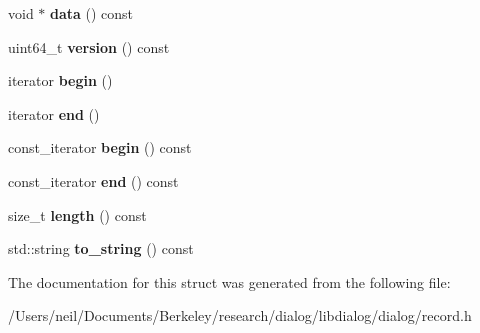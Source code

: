 \begin{DoxyCompactItemize}
void $\ast$ {\bfseries data} () const
\item 
\mbox{\label{structdialog_1_1record__t_a52dbda4f5f04a5ec4c5588241c3a5533}} 
uint64\+\_\+t {\bfseries version} () const
\item 
\mbox{\label{structdialog_1_1record__t_a841131722da9228e784e29188ba77c5b}} 
iterator {\bfseries begin} ()
\item 
\mbox{\label{structdialog_1_1record__t_ae0881e9d5b98f01480cb62da5441795c}} 
iterator {\bfseries end} ()
\item 
\mbox{\label{structdialog_1_1record__t_a56205f6df46bbd0003d33c7a1fc97814}} 
const\+\_\+iterator {\bfseries begin} () const
\item 
\mbox{\label{structdialog_1_1record__t_a3c11548c92f6fe3c8c02adaeeca3a6f1}} 
const\+\_\+iterator {\bfseries end} () const
\item 
\mbox{\label{structdialog_1_1record__t_a6b7f1ea9625f0dad11bc53dcedb2f1a6}} 
size\+\_\+t {\bfseries length} () const
\item 
\mbox{\label{structdialog_1_1record__t_a60677227ea92a2e7672bd4bb16d615f3}} 
std\+::string {\bfseries to\+\_\+string} () const
\end{DoxyCompactItemize}


The documentation for this struct was generated from the following file\+:\begin{DoxyCompactItemize}
\item 
/\+Users/neil/\+Documents/\+Berkeley/research/dialog/libdialog/dialog/record.\+h\end{DoxyCompactItemize}
